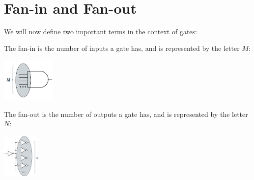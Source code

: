 \documentclass[nobib]{tufte-handout}
\begin{document}
\section{Fan-in and Fan-out}
We will now define two important terms in the context of gates:
\begin{multicols}{2}
    \begin{defbox}
        The fan-in is the number of inputs a gate has, and is represented by the letter $M$:
        \begin{center}
            \includegraphics*[width = 100px]{images/fanin.png}
        \end{center}
    \end{defbox}
    \begin{defbox}
        The fan-out is the number of outputs a gate has, and is represented by the letter $N$:
        \begin{center}
            \includegraphics*[width = 70px]{images/fanout.png}
        \end{center}
    \end{defbox}
\end{multicols}
\end{document}
